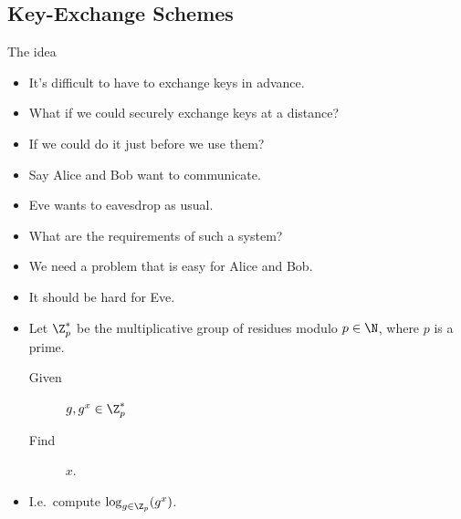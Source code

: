 \subsection{Key-Exchange Schemes}

\begin{frame}
  \begin{block}{The idea}
    \begin{itemize}
      \item It's difficult to have to exchange keys in advance.

        \pause{}

      \item What if we could securely exchange keys at a distance?
      \item If we could do it just before we use them?
    \end{itemize}
  \end{block}

  \pause{}

  \begin{exercise}
    \begin{itemize}
      \item Say Alice and Bob want to communicate.
      \item Eve wants to eavesdrop as usual.
      \item What are the requirements of such a system?
    \end{itemize}
  \end{exercise}
\end{frame}

\begin{frame}
  \begin{solution}[Requirements]
    \begin{itemize}
      \item We need a problem that is easy for Alice and Bob.
      \item It should be hard for Eve.
    \end{itemize}
  \end{solution}
\end{frame}

\begin{frame}
  \begin{definition}
    \begin{itemize}
      \item Let \(\Z_p^*\) be the multiplicative group of residues modulo 
        \(p\in \N\), where \(p\) is a prime.

        \pause{}

        \begin{description}
          \item[Given] \(g, g^x\in \Z_p^*\)
          \item[Find] \(x\).
        \end{description}

      \item I.e.\ compute \(\log_{g\in \Z_p}(g^x)\).
    \end{itemize}
  \end{definition}
\end{frame}


